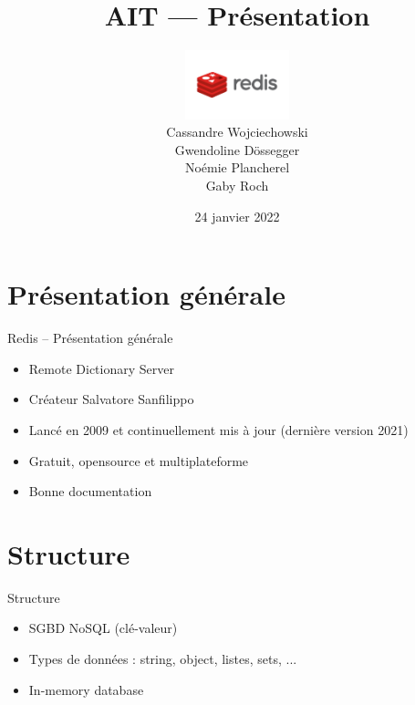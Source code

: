 \documentclass[aspectratio=169]{beamer}
\title{AIT --- Présentation}
\author{\includegraphics[height=2cm]{logo}\\Cassandre Wojciechowski \\ Gwendoline Dössegger \\ Noémie Plancherel \\ Gaby Roch}
\date{24 janvier 2022}
\begin{document}
\begin{frame}
  \titlepage
\end{frame}

\section{Présentation générale}
\begin{frame}{Redis -- Présentation générale}
 \begin{itemize}
  \item Remote Dictionary Server
  \item Créateur Salvatore Sanfilippo
  \item Lancé en 2009 et continuellement mis à jour (dernière version 2021)
  \item Gratuit, opensource et multiplateforme
  \item Bonne documentation
 \end{itemize}
\end{frame}

\section{Structure}
\begin{frame}{Structure}
\begin{itemize}
  \item SGBD NoSQL (clé-valeur)
  \item Types de données : string, object, listes, sets, ...
  \item In-memory database
\end{itemize}
\end{frame}
\end{document}
